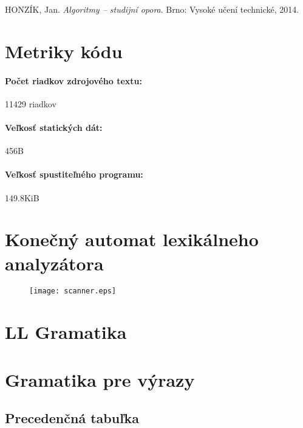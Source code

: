 \documentclass[12pt,a4paper,titlepage,final]{article}
\begin{document}
\begin{thebibliography}{1}

HONZÍK, Jan. \emph{Algoritmy -- studijní opora}. 
Brno: Vysoké učení technické, 2014.

\end{thebibliography}

\appendix

\section{Metriky kódu} \label{metriky}
\paragraph{Počet riadkov zdrojového textu:} 11429 riadkov
\paragraph{Veľkosť statických dát:} 456B
\paragraph{Veľkosť spustiteľného programu:} 149.8KiB

\section{Konečný automat lexikálneho analyzátora}\label{chap:scanner}

\begin{figure}[H]
\begin{center}
	\texttt{[image: scanner.eps]}
	\label{fig:scanner}
\end{center}
\end{figure}

%
\section{LL Gramatika} \label{gramatika}


%
\section{Gramatika pre výrazy} \label{gramatika_expr}




%
\clearpage
\begin{landscape}
	\section{Precedenčná tabuľka} \label{precedencna_tabulka}
	
\end{landscape}
\clearpage
\newpage
\end{document}
